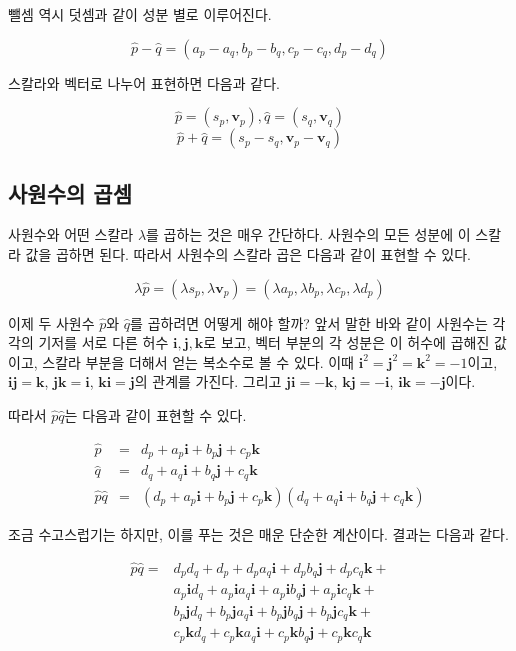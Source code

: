 뺄셈 역시 덧셈과 같이 성분 별로 이루어진다.

$$\hat{p} - \hat{q} = (a_p - a_q, b_p - b_q , c_p - c_q , d_p - d_q)$$

스칼라와 벡터로 나누어 표현하면 다음과 같다.

$$\hat{p} = (s_p, \mathbf v_p), \hat{q} = (s_q, \mathbf v_q)$$
$$\hat{p} + \hat{q} = (s_p - s_q , \mathbf v_p - \mathbf v_q )$$

\subsection{사원수의 곱셈}

사원수와 어떤 스칼라 $\lambda$를 곱하는 것은 매우 간단하다. 사원수의 모든 성분에 이 스칼라 값을 곱하면 된다.
따라서 사원수의 스칼라 곱은 다음과 같이 표현할 수 있다.

$$\lambda \hat{p} = (\lambda s_p , \lambda \mathbf v_p) = (\lambda a_p, \lambda b_p, \lambda c_p, \lambda d_p)$$

이제 두 사원수 $\hat{p}$와 $\hat{q}$를 곱하려면 어떻게 해야 할까?
앞서 말한 바와 같이 사원수는 각각의 기저를 서로 다른 허수 $\mathbf i, \mathbf j, \mathbf k$로 보고,
벡터 부분의 각 성분은 이 허수에 곱해진 값이고, 스칼라 부분을 더해서 얻는 복소수로 볼 수 있다.
이때 $\mathbf i^2 = \mathbf j^2 = \mathbf k^2 = -1$이고, $\mathbf {ij} = \mathbf k$, 
$\mathbf {jk} = \mathbf i$, $\mathbf {ki} = \mathbf j$의 관계를 가진다. 그리고 
$\mathbf {ji} = -\mathbf k$, $\mathbf {kj} = -\mathbf i$, $\mathbf {ik} = -\mathbf j$이다.

따라서 $\hat{p} \hat{q}$는 다음과 같이 표현할 수 있다.

\begin{eqnarray}
\hat{p} & = & d_p + a_p{\mathbf i} + b_p{\mathbf j} + c_p{\mathbf k} \\ \nonumber
\hat{q} & = & d_q + a_q{\mathbf i} + b_q{\mathbf j} + c_q{\mathbf k} \\ \nonumber
\hat{p}\hat{q} &=& (d_p + a_p{\mathbf i} + b_p{\mathbf j} + c_p{\mathbf k} )(d_q + a_q{\mathbf i} + b_q{\mathbf j} + c_q{\mathbf k})
\end{eqnarray}

조금 수고스럽기는 하지만, 이를 푸는 것은 매운 단순한 계산이다. 결과는 다음과 같다.

\begin{eqnarray}
\hat{p}\hat{q} = &
d_p d_q + d_p + d_p a_q{\mathbf i} + d_p b_q{\mathbf j} + d_p c_q{\mathbf k} + \\ \nonumber
& a_p {\mathbf i} d_q + a_p {\mathbf i}  a_q{\mathbf i} + a_p {\mathbf i} b_q{\mathbf j} + a_p {\mathbf i}  c_q{\mathbf k} + \\ \nonumber
& b_p {\mathbf j} d_q + b_p {\mathbf j} a_q{\mathbf i} + b_p {\mathbf j} b_q{\mathbf j} + b_p {\mathbf j} c_q{\mathbf k} + \\ \nonumber
& c_p {\mathbf k} d_q + c_p {\mathbf k} a_q{\mathbf i} + c_p {\mathbf k} b_q{\mathbf j} + c_p {\mathbf k} c_q{\mathbf k} 
\end{eqnarray}

